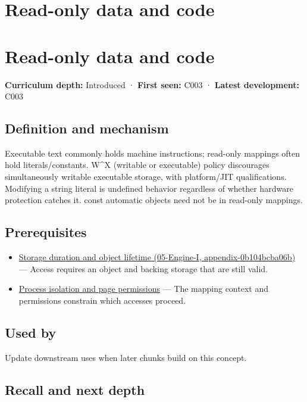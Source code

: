 \hypertarget{appendix-5f9e5e2f0a5e}{}
\section*{Read-only data and code}
\section{Read-only data and code}\label{read-only-data-and-code}

\textbf{Curriculum depth:} Introduced · \textbf{First seen:} C003 · \textbf{Latest development:} C003

\subsection{Definition and mechanism}\label{definition-and-mechanism}

Executable text commonly holds machine instructions; read-only mappings often hold literals/constants. W\^{}X (writable or executable) policy discourages simultaneously writable executable storage, with platform/JIT qualifications. Modifying a string literal is undefined behavior regardless of whether hardware protection catches it. const automatic objects need not be in read-only mappings.

\subsection{Prerequisites}\label{prerequisites}

\begin{itemize}
\tightlist
\item
  \href{}{Storage duration and object lifetime (05-Engine-I, appendix-0b104bcba06b)} --- Access requires an object and backing storage that are still valid.
\item
  \hyperref[appendix-c2a9ad1e2b49]{Process isolation and page permissions} --- The mapping context and permissions constrain which accesses proceed.
\end{itemize}

\subsection{Used by}\label{used-by}

Update downstream uses when later chunks build on this concept.

\subsection{Recall and next depth}\label{recall-and-next-depth}


